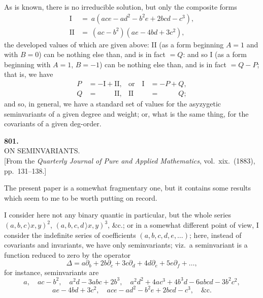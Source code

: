 \documentclass[11pt,a4paper]{article}
\begin{document}
\thispagestyle{plain}
\noindent As is known, there is no irreducible solution, but only the composite forms
\begin{align*}
\text{I}\  &=\ a(ace - ad^{2} - b^{2}e + 2bcd - c^{3}),\\
\text{II} &=\ (ac - b^{2})(ae - 4bd + 3c^{2}),
\end{align*}
the developed values of which are given above: II (as a form beginning $A = 1$ and with $B = 0$) can be nothing else than, and is in fact $= Q$: and so I (as a form beginning with $A = 1$, $B = -1$) can be nothing else than, and is in fact $= Q - P$; that is, we have
\begin{align*}
P &= -\text{I} + \text{II}, &\text{or}\quad \text{I} &= -P + Q,\\
Q &= \phantom{-\text{I} + {}}\text{II}, & \text{II} &= \phantom{-P + {}}Q;
\end{align*}
and so, in general, we have a standard set of values for the asyzygetic seminvariants of a given degree and weight; or, what is the same thing, for the covariants of a given deg-order.
\clearpage

\fancyhead[C]{\small\ }
\fancyhead[R]{\small [801}

\thispagestyle{plain}
\begin{center}
\vspace*{2em}
{\Large\bfseries 801.}\\[1.5em]
{\normalsize\scshape ON SEMINVARIANTS.}\\[1em]
{\small [From the \textit{Quarterly Journal of Pure and Applied Mathematics}, vol.~xix.\ (1883), pp.~131--138.]}
\end{center}

\medskip
The present paper is a somewhat fragmentary one, but it contains some results which seem to me to be worth putting on record.

\medskip
I consider here not any binary quantic in particular, but the whole series $(a, b, c\,\rangle x, y)^{2}$, $(a, b, c, d\,\rangle x, y)^{3}$, \&c.; or in a somewhat different point of view, I consider the indefinite series of coefficients $(a, b, c, d, e, \ldots)$; here, instead of covariants and invariants, we have only seminvariants; viz.\ a seminvariant is a function reduced to zero by the operator
\[
\Delta = a\partial_{b} + 2b\partial_{c} + 3c\partial_{d} + 4d\partial_{e} + 5e\partial_{f} + \ldots,
\]
for instance, seminvariants are
\[
a,\quad ac - b^{2},\quad a^{2}d - 3abc + 2b^{3},\quad a^{2}d^{2} + 4ac^{3} + 4b^{3}d - 6abcd - 3b^{2}c^{2},
\]
\[
ae - 4bd + 3c^{2},\quad ace - ad^{2} - b^{2}e + 2bcd - c^{3},\quad \&\text{c}.
\]
\end{document}
